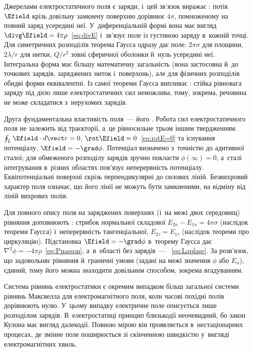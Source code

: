 Джерелами електростатичного поля є заряди, і~цей зв'язок виражає :
потік $\Efield$ крізь довільну замкнену поверхню дорівнює $4\pi$, помноженому на повний
заряд усередині неї. У~диференціальній формі вона має вигляд
$\divg\Efield=4\pi\rho$~\eqref{eq:divE} і~зв'язує поле із густиною заряду в~кожній точці.
Для симетричних розподілів теорема Гаусса одразу дає поле: $2\pi\sigma$ для площини,
$2\lambda/r$ для нитки, $Q/r^2$ зовні сферичної оболонки й~нуль усередині неї.
Інтегральна форма має більшу математичну загальність (вона застосовна й~до точкових
зарядів, заряджених ниток і~поверхонь), але для фізичних розподілів обидві форми
еквівалентні. Із самої теореми Гаусса випливає : стійка рівновага
заряду під дією лише електростатичних сил неможлива, тому, зокрема, речовина не може
складатися з~нерухомих зарядів.

Друга фундаментальна властивість поля~--- його . Робота сил
електростатичного поля не залежить від траєкторії, а~це рівносильне трьом іншим
твердженням: $\oint_L\Efield\cdot d\vect r=0$, $\rot\Efield=0$~\eqref{eq:rotE=0} та
існування потенціалу, $\Efield=-\grad\phi$. Потенціал визначено з~точністю до адитивної
сталої; для обмеженого розподілу зарядів зручно покласти $\phi(\infty)=0$, а~сталі
інтегрування в~різних областях пов'язує неперервність потенціалу. Еквіпотенціальні
поверхні скрізь перпендикулярні до силових ліній. Безвихровий
характер поля означає, що його лінії не можуть бути замкненими, на відміну від ліній
вихрових полів.

Для повного опису поля на заряджених поверхнях (і~на межі двох середовищ) рівняння
доповнюють : стрибок нормальної складової $E_{2n}-E_{1n}=4\pi\sigma$ (наслідок теореми
Гаусса) і~неперервність тангенціальної, $E_{2\tau}=E_{1\tau}$ (наслідок теореми про
циркуляцію). Підстановка $\Efield=-\grad\phi$ в~теорему Гаусса дає  $\nabla^2\phi=-4\pi\rho$~\eqref{eq:Puasson}, а~в~області без зарядів~---
~\eqref{eq:Laplase}. За  розв'язок, що
задовольняє рівняння й~граничні умови (задані на межі значення $\phi$ або $E_n$), єдиний,
тому його можна знаходити довільним способом, зокрема вгадуванням.

Система рівнянь електростатики є окремим випадком більш загальної системи рівнянь
Максвелла для електромагнітного поля, коли часові похідні полів дорівнюють нулю. У~цьому
випадку електричне поле описується лише розподілом зарядів. В~електростатиці принцип
близькодії неочевидний, бо закон Кулона має вигляд далекодії. Повною мірою він
проявляється в~нестаціонарних процесах, де змінне поле поширюється зі скінченною швидкістю
у~вигляді електромагнітних хвиль.



